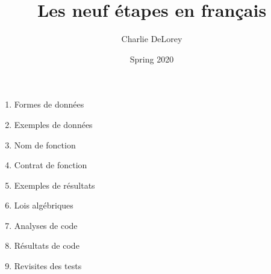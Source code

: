 \documentclass{article}
\title{Les neuf étapes en français}
\author{Charlie DeLorey}
\date{Spring 2020}
\begin{document}
\maketitle

\begin{center}
\begin{varwidth}{\textwidth}
\begin{enumerate}
    \item Formes de données
    \item Exemples de données
    \item Nom de fonction
    \item Contrat de fonction
    \item Exemples de résultats
    \item Lois algébriques
    \item Analyses de code
    \item Résultats de code
    \item Revisites des tests
\end{enumerate}
\end{varwidth}
\end{center}
\end{document}
